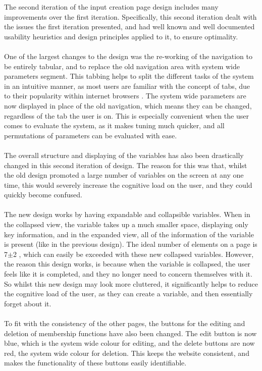 \noindent 
The second iteration of the input creation page design includes many improvements over the first iteration. Specifically, this second iteration dealt with the issues the first iteration presented, and had well known and well documented usability heuristics and design principles applied to it, to ensure optimality. \ \\
\ \\
One of the largest changes to the design was the re-working of the navigation to be entirely tabular, and to replace the old navigation area with system wide parameters segment. This tabbing helps to split the different tasks of the system in an intuitive manner, as most users are familiar with the concept of tabs, due to their popularity within internet browsers \cite{huang2010parallel}. The system wide parameters are now displayed in place of the old navigation, which means they can be changed, regardless of the tab the user is on. This is especially convenient when the user comes to evaluate the system, as it makes tuning much quicker, and all permutations of parameters can be evaluated with ease.\ \\
\ \\
The overall structure and displaying of the variables has also been drastically changed in this second iteration of design. The reason for this was that, whilst the old design promoted a large number of variables on the screen at any one time, this would severely increase the cognitive load on the user, and they could quickly become confused.\ \\
\ \\
The new design works by having expandable and collapsible variables. When in the collapsed view, the variable takes up a much smaller space, displaying only key information, and in the expanded view, all of the information of the variable is present (like in the previous design). The ideal number of elements on a page is 7$\pm$2 \cite{miller1956magical}, which can easily be exceeded with these new collapsed variables. However, the reason this design works, is because when the variable is collapsed, the user feels like it is completed, and they no longer need to concern themselves with it. So whilst this new design may look more cluttered, it significantly helps to reduce the cognitive load of the user, as they can create a variable, and then essentially forget about it.\ \\
\ \\
To fit with the consistency of the other pages, the buttons for the editing and deletion of membership functions have also been changed. The edit button is now blue, which is the system wide colour for editing, and the delete buttons are now red, the system wide colour for deletion. This keeps the website consistent, and makes the functionality of these buttons easily identifiable.\ \\
